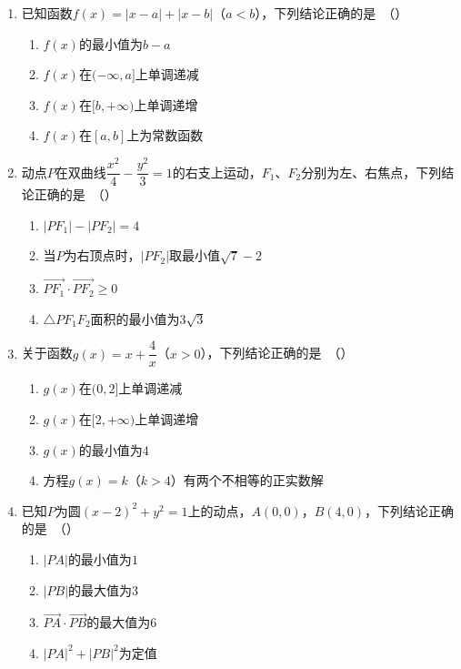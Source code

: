 \documentclass[12pt, a4paper]{ctexart}
\begin{document}
\begin{enumerate}[resume]

\item 已知函数$f(x)=|x-a|+|x-b|$（$a<b$），下列结论正确的是\ （\quad）
\begin{enumerate}[label=\Alph*., itemsep=0pt, topsep=2pt]
\item $f(x)$的最小值为$b-a$
\item $f(x)$在$(-\infty,a]$上单调递减
\item $f(x)$在$[b,+\infty)$上单调递增
\item $f(x)$在$[a,b]$上为常数函数
\end{enumerate}

\item 动点$P$在双曲线$\dfrac{x^2}{4}-\dfrac{y^2}{3}=1$的右支上运动，$F_1$、$F_2$分别为左、右焦点，下列结论正确的是\ （\quad）
\begin{enumerate}[label=\Alph*., itemsep=0pt, topsep=2pt]
\item $|PF_1|-|PF_2|=4$
\item 当$P$为右顶点时，$|PF_2|$取最小值$\sqrt{7}-2$
\item $\overrightarrow{PF_1}\cdot\overrightarrow{PF_2}\geq 0$
\item $\triangle PF_1F_2$面积的最小值为$3\sqrt{3}$
\end{enumerate}

\item 关于函数$g(x)=x+\dfrac{4}{x}$（$x>0$），下列结论正确的是\ （\quad）
\begin{enumerate}[label=\Alph*., itemsep=0pt, topsep=2pt]
\item $g(x)$在$(0,2]$上单调递减
\item $g(x)$在$[2,+\infty)$上单调递增
\item $g(x)$的最小值为$4$
\item 方程$g(x)=k$（$k>4$）有两个不相等的正实数解
\end{enumerate}

\item 已知$P$为圆$(x-2)^2+y^2=1$上的动点，$A(0,0)$，$B(4,0)$，下列结论正确的是\ （\quad）
\begin{enumerate}[label=\Alph*., itemsep=0pt, topsep=2pt]
\item $|PA|$的最小值为$1$
\item $|PB|$的最大值为$3$
\item $\overrightarrow{PA}\cdot\overrightarrow{PB}$的最大值为$6$
\item $|PA|^2+|PB|^2$为定值
\end{enumerate}

\end{enumerate}
\end{document}
